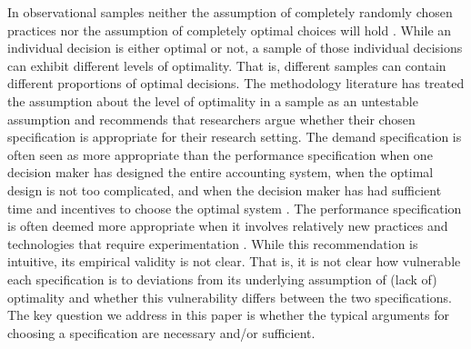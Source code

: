 \documentclass[12pt]{article}
\begin{document}
In observational samples neither the assumption of completely randomly chosen practices nor the assumption of completely optimal choices will hold \citep{brynjolfsson_complementarity_2013}. While an individual decision is either optimal or not, a sample of those individual decisions can exhibit different levels of optimality. That is, different samples can contain different proportions of optimal decisions. The methodology literature has treated the assumption about the level of optimality in a sample as an untestable assumption and recommends that researchers argue whether their chosen specification is appropriate for their research setting. The demand specification is often seen as more appropriate than the performance specification when one decision maker has designed the entire accounting system, when the optimal design is not too complicated, and when the decision maker has had sufficient time and incentives to choose the optimal system \citep{grabner_management_2013, hofmann_organizational_2017, carree_note_2011, johansson_testing_2018}.  The performance specification is often deemed more appropriate when it involves relatively new practices and technologies that require experimentation \citep{carree_note_2011, bedford_management_2016}. While this recommendation is intuitive, its empirical validity is not clear. That is, it is not clear how vulnerable each specification is to deviations from its underlying assumption of (lack of) optimality and whether this vulnerability differs between the two specifications. The key question we address in this paper is whether the typical arguments for choosing a specification are necessary and/or sufficient.
\end{document}
